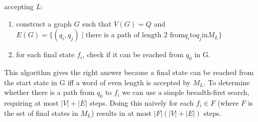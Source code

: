 \documentclass[defaultpackages]{simplereport}
\begin{document}
\begin{itemize}[label=]
    accepting $L$:
    \begin{enumerate}
      \item construct a graph $G$ such that $V(G) = Q$ and $E(G) = \{(q_i, q_j)
        \mid \text{there is a path of length 2 from} q_i \text{to} q_j \text{in}
        M_L\}$
       \item for each final state $f_i$, check if it can be reached from $q_0$
         in G. 
      \end{enumerate}
   This algorithm gives the right answer because a final state can be reached
   from the start state in G iff a word of even length is accepted by $M_L$. To
   determine whether there is a path from $q_0$ to $f_i$ we can use a simple
   breadth-first search, requiring at most $\lvert {V} \rvert + \lvert {E}
   \rvert$ steps. Doing this naively for each $f_i \in F$ (where $F$ is the set
   of final states in $M_L$) results in at most $\lvert F \rvert (\lvert {V} \rvert + \lvert {E}
   \rvert)$ steps.
\end{itemize}
\end{document}
